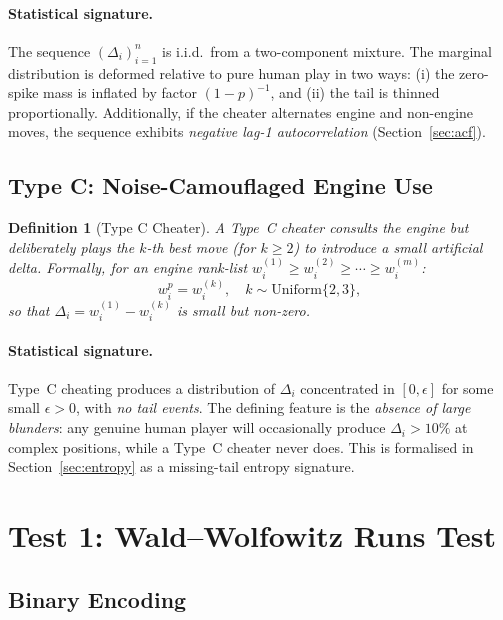 \documentclass[11pt,a4paper]{article}
\newtheorem{definition}{Definition}
\begin{document}
\paragraph{Statistical signature.}
The sequence $(\Delta_i)_{i=1}^n$ is i.i.d.\ from a two-component mixture.
The marginal distribution is deformed relative to pure human play in two ways:
(i) the zero-spike mass is inflated by factor $(1-p)^{-1}$, and
(ii) the tail is thinned proportionally. Additionally, if the cheater
alternates engine and non-engine moves, the sequence exhibits
\emph{negative lag-1 autocorrelation} (Section~\ref{sec:acf}).

\subsection{Type C: Noise-Camouflaged Engine Use}

\begin{definition}[Type C Cheater]
A Type~C cheater consults the engine but deliberately plays the
$k$-th best move (for $k \geq 2$) to introduce a small artificial delta.
Formally, for an engine rank-list
$w^{(1)}_i \geq w^{(2)}_i \geq \cdots \geq w^{(m)}_i$:
\begin{equation}
  w^p_i = w^{(k)}_i, \quad k \sim \mathrm{Uniform}\{2, 3\},
\end{equation}
so that $\Delta_i = w^{(1)}_i - w^{(k)}_i$ is small but non-zero.
\end{definition}

\paragraph{Statistical signature.}
Type~C cheating produces a distribution of $\Delta_i$ concentrated in
$[0, \epsilon]$ for some small $\epsilon > 0$, with \emph{no tail events}.
The defining feature is the \emph{absence of large blunders}: any genuine
human player will occasionally produce $\Delta_i > 10\%$ at complex positions,
while a Type~C cheater never does. This is formalised in Section~\ref{sec:entropy}
as a missing-tail entropy signature.

\section{Test 1: Wald--Wolfowitz Runs Test}
\label{sec:runs}

\subsection{Binary Encoding}
\end{document}
